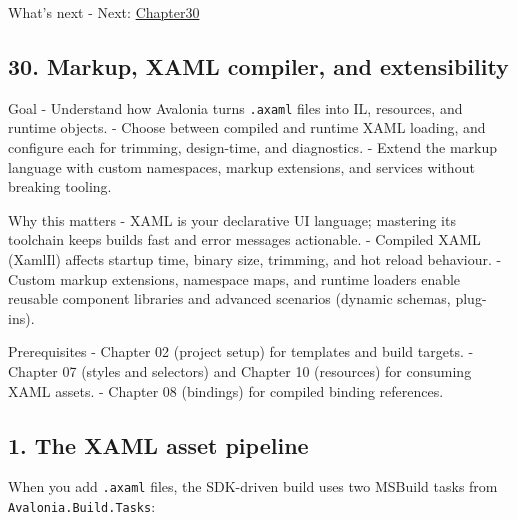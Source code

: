 What's next - Next: \href{Chapter30.md}{Chapter30}

\newpage

\subsection{30. Markup, XAML compiler, and
extensibility}\label{markup-xaml-compiler-and-extensibility}

Goal - Understand how Avalonia turns \passthrough{\lstinline!.axaml!}
files into IL, resources, and runtime objects. - Choose between compiled
and runtime XAML loading, and configure each for trimming, design-time,
and diagnostics. - Extend the markup language with custom namespaces,
markup extensions, and services without breaking tooling.

Why this matters - XAML is your declarative UI language; mastering its
toolchain keeps builds fast and error messages actionable. - Compiled
XAML (XamlIl) affects startup time, binary size, trimming, and hot
reload behaviour. - Custom markup extensions, namespace maps, and
runtime loaders enable reusable component libraries and advanced
scenarios (dynamic schemas, plug-ins).

Prerequisites - Chapter 02 (project setup) for templates and build
targets. - Chapter 07 (styles and selectors) and Chapter 10 (resources)
for consuming XAML assets. - Chapter 08 (bindings) for compiled binding
references.

\subsection{1. The XAML asset pipeline}\label{the-xaml-asset-pipeline}

When you add \passthrough{\lstinline!.axaml!} files, the SDK-driven
build uses two MSBuild tasks from
\passthrough{\lstinline!Avalonia.Build.Tasks!}:

